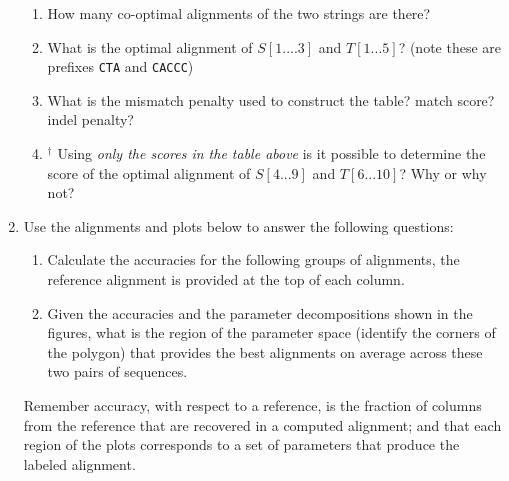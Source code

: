 \documentclass[11pt, oneside]{article}   	%
\begin{document}
\begin{enumerate}
\begin{center}
{\begin{tabular}{|c||c|c|c|c|c|c|c|c|c|c|c|c|}
\hline 
\end{tabular}
}
\end{center}
\begin{enumerate}
\item How many co-optimal alignments of the two strings are there? 
\item What is the optimal alignment of $S[1....3]$ and $T[1...5]$? (note these are prefixes \texttt{CTA} and \texttt{CACCC})
\item What is the mismatch penalty used to construct the table? match score? indel penalty? 
\item$^\dag$ Using \textit{only the scores in the table above} is it possible to determine the score of the optimal alignment of $S[4...9]$ and $T[6...10]$? Why or why not?
\end{enumerate}


\clearpage
\item 
Use the alignments and plots below to answer the following questions:
\begin{enumerate}
\item Calculate the accuracies for the following groups of alignments, 
the reference alignment is provided at the top of each column. 
\item Given the accuracies and the parameter decompositions shown in the figures, 
what is the region of the parameter space (identify the corners of the polygon) 
that provides the best alignments on average across these two pairs of sequences. 
\end{enumerate}
Remember accuracy, with respect to a reference, is the fraction of columns from the reference that are recovered in a computed alignment; 
and that each region of the plots corresponds to a set of parameters that produce the labeled alignment.


\end{enumerate}
\end{document}

